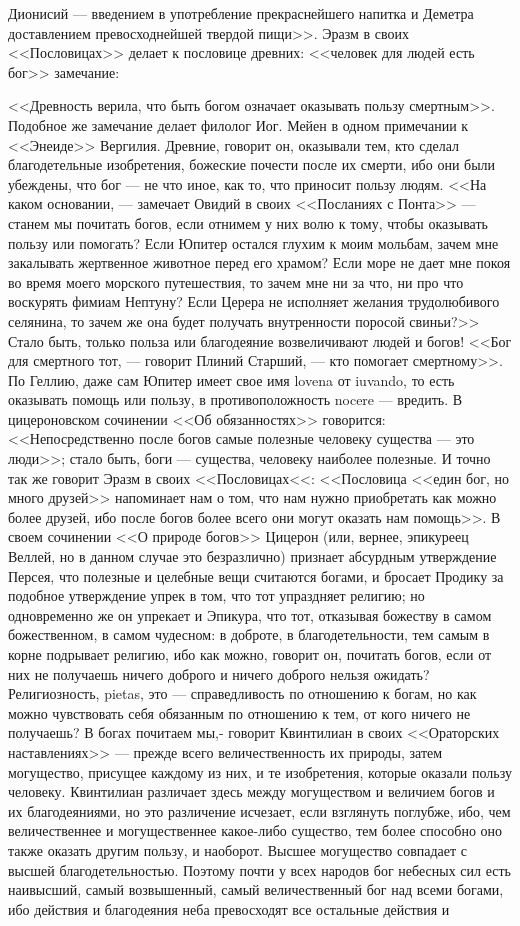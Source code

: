 \documentclass[12pt]{article}
\begin{document}
Дионисий --- введением в употребление прекраснейшего напитка и Деметра доставлением превосходнейшей твердой пищи>>. Эразм в своих <<Пословицах>> делает к пословице древних: <<человек для людей есть бог>>  замечание: 

<<Древность верила, что быть богом означает оказывать пользу смертным>>. Подобное же замечание делает филолог Иог. Мейен в одном примечании к <<Энеиде>> Вергилия. Древние, говорит он, оказывали тем, кто сделал благодетельные изобретения, божеские почести после их смерти, ибо они были убеждены, что бог --- не что иное, как то, что приносит пользу людям. <<На каком основании, --- замечает Овидий в своих <<Посланиях с Понта>>  --- станем мы почитать богов, если отнимем у них волю к тому, чтобы оказывать пользу или помогать? Если Юпитер остался глухим к моим мольбам, зачем мне закалывать жертвенное животное перед его храмом? Если море не дает мне покоя во время моего морского путешествия, то зачем мне ни за что, ни про что воскурять фимиам Нептуну? Если Церера не исполняет желания трудолюбивого селянина, то зачем же она будет получать внутренности поросой свиньи?>> Стало быть, только польза или благодеяние возвеличивают людей и богов! <<Бог для смертного тот, --- говорит Плиний Старший, --- кто помогает смертному>>. По Геллию, даже сам Юпитер имеет свое имя lovena от iuvando, то есть оказывать помощь или пользу, в противоположность nocere --- вредить. В цицероновском сочинении <<Об обязанностях>> говорится: <<Непосредственно после богов самые полезные человеку существа --- это люди>>; стало быть, боги --- существа, человеку наиболее полезные. И точно так же говорит Эразм в своих <<Пословицах<<: <<Пословица <<един бог, но много друзей>> напоминает нам о том, что нам нужно приобретать как можно более друзей, ибо после богов более всего они могут оказать нам помощь>>. В своем сочинении <<О природе богов>> Цицерон (или, вернее, эпикуреец Веллей, но в данном случае это безразлично) признает абсурдным утверждение Персея, что полезные и целебные вещи считаются богами, и бросает Продику за подобное утверждение упрек в том, что тот упраздняет религию; но одновременно же он упрекает и Эпикура, что тот, отказывая божеству в самом божественном, в самом чудесном: в доброте, в благодетельности, тем самым в корне подрывает религию, ибо как можно, говорит он, почитать богов, если от них не получаешь ничего доброго и ничего доброго нельзя ожидать? Религиозность, pietas, это --- справедливость по отношению к богам, но как можно чувствовать себя обязанным по отношению к тем, от кого ничего не получаешь? В богах почитаем мы,- говорит Квинтилиан в своих <<Ораторских наставлениях>>  --- прежде всего величественность их природы, затем могущество, присущее каждому из них, и те изобретения, которые оказали пользу человеку. Квинтилиан различает здесь между могуществом и величием богов и их благодеяниями, но это различение исчезает, если взглянуть поглубже, ибо, чем величественнее и могущественнее какое-либо существо, тем более способно оно также оказать другим пользу, и наоборот. Высшее могущество совпадает с высшей благодетельностью. Поэтому почти у всех народов бог небесных сил есть наивысший, самый возвышенный, самый величественный бог над всеми богами, ибо действия и благодеяния неба превосходят все остальные действия и 
\end{document}
